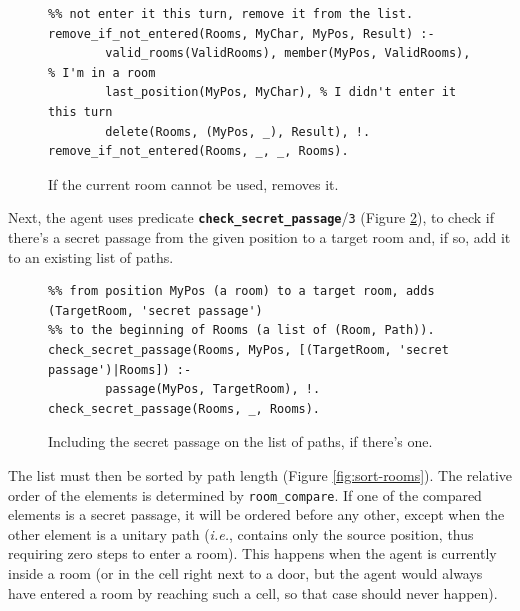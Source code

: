 \documentclass[12pt,a4paper]{article}
\newcommand{\varname}[1]{\texttt{#1}}
\newcommand{\varnamebf}[1]{\textbf{\texttt{#1}}}
\newcommand{\predprot}[2]{{\color{MidnightBlue}\varnamebf{#1}}/{\color{Mulberry}\varname{#2}}}
\newcommand{\predname}[1]{{\color{MidnightBlue}\varname{#1}}}
\begin{document}
\begin{figure}[H]
	\centering
\begin{lstlisting}[style=Prolog-pygsty]
%% remove_if_not_entered(Rooms, MyChar, MyPos, Result) - if i'm in a room and did
%% not enter it this turn, remove it from the list.
remove_if_not_entered(Rooms, MyChar, MyPos, Result) :-
		valid_rooms(ValidRooms), member(MyPos, ValidRooms), % I'm in a room
		last_position(MyPos, MyChar), % I didn't enter it this turn
		delete(Rooms, (MyPos, _), Result), !.
remove_if_not_entered(Rooms, _, _, Rooms).
\end{lstlisting}
	\caption{If the current room cannot be used, removes it.} 
	\label{fig:remove-not-entered}
\end{figure}

Next, the agent uses predicate \predprot{check\_secret\_passage}{3} (Figure \ref{fig:check-passage}), to check if there's a secret passage from the given position to a target room and, if so, add it to an existing list of paths.

\begin{figure}[H]
	\centering
\begin{lstlisting}[style=Prolog-pygsty]
%% check_secret_passage(Rooms, MyPos, Result) - if there's a secret passage
%% from position MyPos (a room) to a target room, adds (TargetRoom, 'secret passage')
%% to the beginning of Rooms (a list of (Room, Path)).
check_secret_passage(Rooms, MyPos, [(TargetRoom, 'secret passage')|Rooms]) :-
		passage(MyPos, TargetRoom), !.
check_secret_passage(Rooms, _, Rooms).
\end{lstlisting}
	\caption{Including the secret passage on the list of paths, if there's one.} 
	\label{fig:check-passage}
\end{figure}

The list must then be sorted by path length (Figure \ref{fig:sort-rooms}). The relative order of the elements is determined by \predname{room\_compare}. If one of the compared elements is a secret passage, it will be ordered before any other, except when the other element is a unitary path (\textit{i.e.}, contains only the source position, thus requiring zero steps to enter a room). This happens when the agent is currently inside a room (or in the cell right next to a door, but the agent would always have entered a room by reaching such a cell, so that case should never happen).
\end{document}
